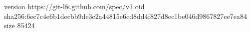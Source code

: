 version https://git-lfs.github.com/spec/v1
oid sha256:6ec7c4e6b1decbb9de3c2a44815e6cd8dd4f827d8ec1be046d9867827ee7ea84
size 85424
